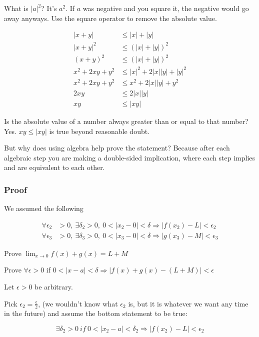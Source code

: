 \documentclass[12pt]{article}
\theoremstyle{plain}
\theoremstyle{remark}
\theoremstyle{definition}
\begin{document}
What is \(|a|^{2}\)? It's \(a^{2}\). If \(a\) was negative and you
square it, the negative would go away anyways. Use the square operator
to remove the absolute value.

\begin{align*}
|x + y| &\leq |x| + |y| \\
|x + y|^{2} &\leq \left( |x| + |y| \right)^{2} \\
(x + y)^{2} &\leq \left( |x| + |y| \right)^{2} \\
x^{2} + 2xy + y^{2} &\leq |x|^{2} + 2|x||y| + |y|^{2} \\
x^{2} + 2xy + y^{2} &\leq x^{2} + 2|x||y| + y^{2} \\
2xy &\leq 2|x||y| \\
xy &\leq |xy|
\end{align*}


Is the absolute value of a number always greater than or equal to that
number? Yes. \(xy \leq |xy|\) is true beyond reasonable doubt.

But why does using algebra help prove the statement? Because after each
algebraic step you are making a double-sided implication, where each
step implies and are equivalent to each other.


\subsubsection{Proof}

We assumed the following

\begin{align*}
\forall\epsilon_{2} &> 0,\ \exists\delta_{2} > 0,\ 0 < \left| x_{2} - 0 \right| < \delta \Rightarrow \left| f\left( x_{2} \right) - L \right| < \epsilon_{2} \\
\forall\epsilon_{3} &> 0,\ \exists\delta_{3} > 0,\ 0 < |x_{3} - 0| < \delta \Rightarrow |g(x_{3}) - M| < \epsilon_{3}
\end{align*}


Prove \(\lim_{x \rightarrow 0}{f(x) + g(x)} = L + M\)

Prove \(\forall\epsilon > 0\) if
\(0 < |x - a| < \delta \Rightarrow \left| f(x) + g(x) - (L + M) \right| < \epsilon\)

Let \(\epsilon > 0\) be arbitrary.

Pick \(\epsilon_{2} = \frac{\epsilon}{2}\), (we wouldn't know what
\(\epsilon_{2}\) is, but it is whatever we want any time in the future)
and assume the bottom statement to be true:

\[\exists\delta_{2} > 0\ if\ 0 < \left| x_{2} - a \right| < \delta_{2} \Rightarrow \left| f\left( x_{2} \right) - L \right| < \epsilon_{2}\]
\end{document}
